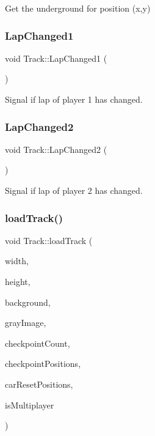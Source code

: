 Get the underground for position (x,y) 

\mbox{\label{class_track_a6341de0f1e60210e259507b93bf29872}} 
\subsubsection{\texorpdfstring{LapChanged1}{LapChanged1}}
{\footnotesize\ttfamily void Track\+::\+Lap\+Changed1 (\begin{DoxyParamCaption}{ }\end{DoxyParamCaption})\hspace{0.3cm}{\ttfamily [signal]}}



Signal if lap of player 1 has changed. 

\mbox{\label{class_track_ab8fa84676e8143eb45da43d39c0e62b1}} 
\subsubsection{\texorpdfstring{LapChanged2}{LapChanged2}}
{\footnotesize\ttfamily void Track\+::\+Lap\+Changed2 (\begin{DoxyParamCaption}{ }\end{DoxyParamCaption})\hspace{0.3cm}{\ttfamily [signal]}}



Signal if lap of player 2 has changed. 

\mbox{\label{class_track_a2e3f26b19389218a3119c31a40265b6a}} 
\subsubsection{\texorpdfstring{loadTrack()}{loadTrack()}}
{\footnotesize\ttfamily void Track\+::load\+Track (\begin{DoxyParamCaption}\item[{int}]{width,  }\item[{int}]{height,  }\item[{Q\+Image}]{background,  }\item[{Q\+Image}]{gray\+Image,  }\item[{int}]{checkpoint\+Count,  }\item[{\mbox{\hyperlink{class_world_position}{World\+Position}} $\ast$}]{checkpoint\+Positions,  }\item[{\mbox{\hyperlink{class_world_position}{World\+Position}} $\ast$}]{car\+Reset\+Positions,  }\item[{bool}]{is\+Multiplayer }\end{DoxyParamCaption})}



